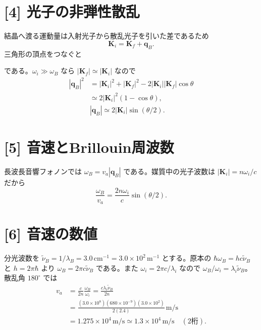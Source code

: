 \documentclass[11pt,a4paper]{article}
\begin{document}
\section*{[4] 光子の非弾性散乱}
結晶へ渡る運動量は入射光子から散乱光子を引いた差であるため
\begin{equation}
 \boldsymbol K_i=\boldsymbol K_f+\boldsymbol q_B.
\end{equation}
三角形の頂点をつなぐと
\begin{center}
\end{center}
である。$\omega_i\gg\omega_B$ なら $|\boldsymbol K_f|\simeq|\boldsymbol K_i|$ なので
\begin{align}
 |\boldsymbol q_B|^2&=|\boldsymbol K_i|^2+|\boldsymbol K_f|^2
 -2|\boldsymbol K_i||\boldsymbol K_f|\cos\theta\\
 &\simeq2|\boldsymbol K_i|^2(1-\cos\theta),\\
 &\boxed{|\boldsymbol q_B|\simeq2|\boldsymbol K_i|\sin(\theta/2).}
\end{align}

\section*{[5] 音速とBrillouin周波数}
長波長音響フォノンでは $\omega_B=v_a|\boldsymbol q_B|$ である。媒質中の光子波数は $|\boldsymbol K_i|=n\omega_i/c$ だから
\begin{equation}
 \boxed{\frac{\omega_B}{v_a}=\frac{2n\omega_i}{c}\sin(\theta/2).}
\end{equation}

\section*{[6] 音速の数値}
分光波数を $\tilde\nu_B=1/\lambda_B=3.0\,\mathrm{cm^{-1}}=3.0\times10^2\,\mathrm{m^{-1}}$ とする。原本の $\hbar\omega_B=hc\tilde\nu_B$ と $h=2\pi\hbar$ より $\omega_B=2\pi c\tilde\nu_B$ である。また $\omega_i=2\pi c/\lambda_i$ なので $\omega_B/\omega_i=\lambda_i\tilde\nu_B$。散乱角 $180^\circ$ では
\begin{align}
 v_a&=\frac{c}{2n}\frac{\omega_B}{\omega_i}
 =\frac{c\lambda_i\tilde\nu_B}{2n}\\
 &=\frac{(3.0\times10^8)(680\times10^{-9})(3.0\times10^2)}{2(2.4)}\,\mathrm{m/s}\\
 &=1.275\times10^4\,\mathrm{m/s}
 \simeq\boxed{1.3\times10^4\,\mathrm{m/s}}\quad(2\text{桁}).
\end{align}
\end{document}
